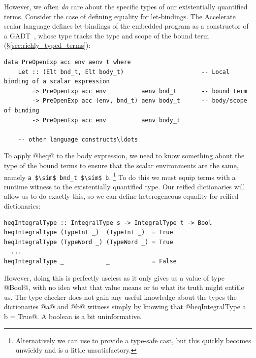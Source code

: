 However, we often \emph{do} care about the specific types of our existentially
quantified terms. Consider the case of defining equality for let-bindings.
The Accelerate scalar language defines let-bindings of the embedded program as a
constructor of a GADT~\cite{Jones:2006eh}, whose type tracks the type and scope
of the bound term (\S\ref{sec:richly_typed_terms}):
%
\begin{lstlisting}[style=haskell]
data PreOpenExp acc env aenv t where
    Let :: (Elt bnd_t, Elt body_t)                      -- Local binding of a scalar expression
        => PreOpenExp acc env          aenv bnd_t       -- bound term
        -> PreOpenExp acc (env, bnd_t) aenv body_t      -- body/scope of binding
        -> PreOpenExp acc env          aenv body_t

    -- other language constructs\ldots
\end{lstlisting}
%
To apply @heq@ to the body expression, we need to know something about
the type of the bound terms to ensure that the scalar environments are the same,
namely \lstinline[style=inline,mathescape]{a $\sim$ bnd_t $\sim$ b}.%
\footnote{Alternatively we can use  to provide a
type-safe cast, but this quickly becomes unwieldy and is a little
unsatisfactory.} To do this we must equip terms with a runtime witness to the
existentially quantified type. Our reified dictionaries will allow us to do
exactly this, so we can define heterogeneous equality for reified dictionaries:
%
\begin{lstlisting}[style=haskell]
heqIntegralType :: IntegralType s -> IntegralType t -> Bool
heqIntegralType (TypeInt _)  (TypeInt _)  = True
heqIntegralType (TypeWord _) (TypeWord _) = True
  ...
heqIntegralType _            _            = False
\end{lstlisting}
%
However, doing this is perfectly useless as it only gives us a value of type
@Bool@, with no idea what that value means or to what its truth might
entitle us. The type checker does not gain any useful knowledge about the types
the dictionaries @a@ and @b@ witness simply by knowing that
@heqIntegralType a b = True@. A boolean is a bit uninformative.

